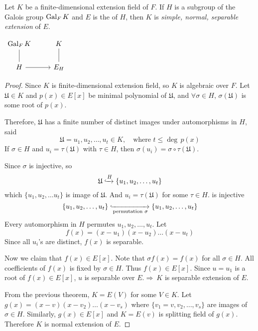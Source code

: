 \begin{lemma}
    Let $K$ be a finite-dimensional extension field of $F$. If $H$ is a subgroup of the Galois group 
    $\operatorname{Gal}_F K$ and $E$ is the  of $H$, then $K$ is 
    \textit{simple, normal, separable extension} of $E$.

    \begin{center}
        $\begin{tikzcd}
            \gal_F K  
            & K \arrow[dash]{d} \\
            H \arrow[dash]{u} \arrow[r]
            & E_H
            \end{tikzcd}
        $
    \end{center}
\end{lemma}
\begin{proof}
    Since $K$ is finite-dimensional extension field, so $K$ is algebraic over $F$. Let $\mathfrak{U} \in K$ and 
    $p(x) \in E[x]$ be minimal polynomial of $\mathfrak{U}$, and $\forall \sigma \in H$, $\sigma(\mathfrak{U})$ is 
    some root of $p(x)$.

    Therefore, $\mathfrak{U}$ has a finite number of distinct images under automorphisms in $H$, said 
    \[
        \mathfrak{U} = u_1, u_2, \ldots, u_t \in K, \quad \text{where } t \leq \deg\, p(x)
    \]
    If $\sigma \in H$ and $u_i = \tau(\mathfrak{U})$ with $\tau \in H$, then $\sigma(u_i) = \sigma \circ \tau (\mathfrak{U})$.

    Since $\sigma$ is injective, so 
    \[
        \mathfrak{U} \xhookrightarrow{H} \{ u_1, u_2, \ldots, u_t \}
    \]
    which $\{ u_1, u_2, \ldots u_t\}$ is image of $\mathfrak{U}$. And $u_i = \tau(\mathfrak{U})$ for some $\tau \in H$.
    is injective 
    \[
        \{ u_1, u_2, \ldots, u_t \} \xhookrightarrow[\text{permutation } \sigma]{} \{ u_1, u_2, \ldots, u_t \}
    \]
    Every automorphism in $H$ permutes $u_1, u_2, \ldots, u_t$. Let 
    \[
        f(x) = (x-u_1)(x-u_2)\ldots(x-u_t)
    \]
    Since all $u_i$'s are distinct, $f(x)$ is separable.

    Now we claim that $f(x) \in E[x]$. Note that $\sigma f(x) = f(x)$ for all $\sigma \in H$. All coefficients of 
    $f(x)$ is fixed by $\sigma \in H$. Thus $f(x) \in E[x]$. Since $u = u_1$ is a root of $f(x) \in E[x]$, $u$ is separable over 
    $E. \Longrightarrow \> K$ is separable extension of $E$.

    From the previous theorem, $K = E(V)$ for some $V \in K$. Let $g(x) = (x - v)(x - v_2) \ldots (x - v_s)$ 
    where $\{ v_1 = v, v_2, \ldots, v_s \}$ are images of $\sigma \in H$. Similarly, $g(x) \in E[x]$ and 
    $K = E(v)$ is splitting field of $g(x)$. Therefore $K$ is normal extension of $E$.
\end{proof}

